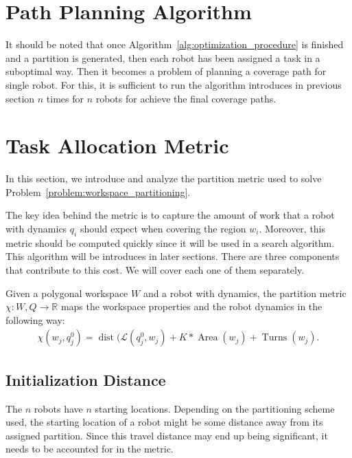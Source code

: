 \documentclass[../main.tex]{subfiles}
\begin{document}
\section{Path Planning Algorithm}
It should be noted that once Algorithm~\ref{alg:optimization_procedure} is finished and a partition is generated, then each robot has been assigned a task in a suboptimal way. Then it becomes a problem of planning a coverage path for single robot. For this, it is sufficient to run the algorithm introduces in previous section $n$ times for $n$ robots for achieve the final coverage paths.


\section{Task Allocation Metric}
\label{sec:task_allocation_metric}

In this section, we introduce and analyze the partition metric used to solve Problem~\ref{problem:workspace_partitioning}.

The key idea behind the metric is to capture the amount of work that a robot with dynamics $q_i$ should expect when covering the region $w_i$. Moreover, this metric should be computed quickly since it will be used in a search algorithm. This algorithm will be introduces in later sections. There are three components that contribute to this cost. We will cover each one of them separately.

\begin{definition}
Given a polygonal workspace $W$ and a robot with dynamics, the partition metric $\chi:W,Q\to\mathbb{R}$ maps the workspace properties and the robot dynamics in the following way:
	\begin{equation}
		\begin{aligned}
			\chi(w_j,q_j^0)=\operatorname{dist}(\mathcal{L}(q^0_j,w_j)+K*\operatorname{Area}(w_j)+\operatorname{Turns}(w_j).
		\end{aligned}
	\end{equation}
\end{definition}


\subsection{Initialization Distance}

The $n$ robots have $n$ starting locations. Depending on the partitioning scheme used, the starting location of a robot might be some distance away from its assigned partition. Since this travel distance may end up being significant, it needs to be accounted for in the metric.
\end{document}
